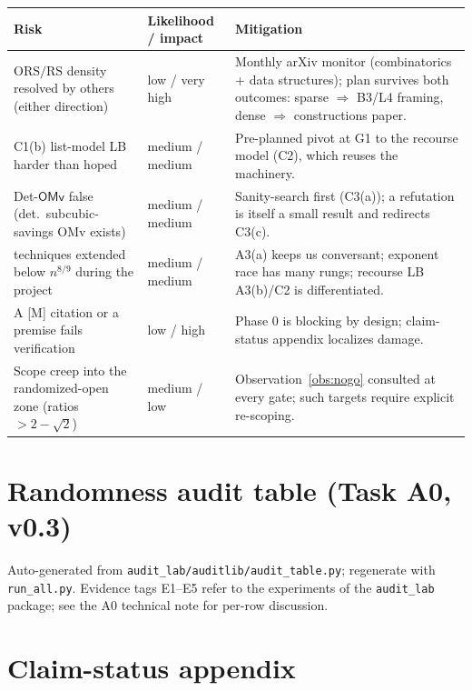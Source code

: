 \documentclass[11pt]{article}
\theoremstyle{definition}
\theoremstyle{remark}
\newcommand{\statusM}{\textcolor{orange!80!black}{\textsf{[M]}}}
\newcommand{\ORS}{\mathrm{ORS}}
\newcommand{\RS}{\mathrm{RS}}
\newcommand{\OMv}{\mathsf{OMv}}
\begin{document}
\begin{center}
\small
\begin{tabular}{@{}p{}p{}p{}@{}}
\toprule
Risk & Likelihood / impact & Mitigation\\
\midrule
$\ORS/\RS$ density resolved by others (either direction) & low / very
high & Monthly arXiv monitor (combinatorics + data structures); plan
survives both outcomes: sparse $\Rightarrow$ B3/L4 framing, dense
$\Rightarrow$ constructions paper.\\
C1(b) list-model LB harder than hoped & medium / medium & Pre-planned
pivot at G1 to the recourse model (C2), which reuses the machinery.\\
Det-$\OMv$ false (det.\ subcubic-savings OMv exists) & medium / medium &
Sanity-search first (C3(a)); a refutation is itself a small result and
redirects C3(c).\\
\cite{BBKS25} techniques extended below $n^{8/9}$ during the project &
medium / medium & A3(a) keeps us conversant; exponent race has many
rungs; recourse LB A3(b)/C2 is differentiated.\\
A \statusM{} citation or a premise fails verification & low / high &
Phase 0 is blocking by design; claim-status appendix localizes damage.\\
Scope creep into the randomized-open zone
(ratios $>2-\sqrt2$) & medium / low & Observation~\ref{obs:nogo}
consulted at every gate; such targets require explicit re-scoping.\\
\bottomrule
\end{tabular}
\end{center}

\appendix
\section{Randomness audit table (Task A0, v0.3)}
\label{app:audit}
Auto-generated from \texttt{audit\_lab/auditlib/audit\_table.py};
regenerate with \texttt{run\_all.py}. Evidence tags E1--E5 refer to
the experiments of the \texttt{audit\_lab} package; see the A0
technical note for per-row discussion.



\section{Claim-status appendix}
\label{app:claims}
\end{document}
